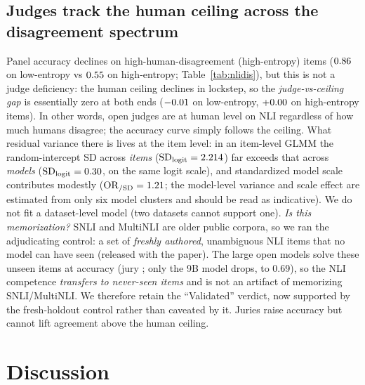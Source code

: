 \subsection{Judges track the human ceiling across the disagreement spectrum}
Panel accuracy declines on high-human-disagreement (high-entropy) items ($0.86$ on low-entropy vs
$0.55$ on high-entropy; Table~\ref{tab:nlidis}), but this is not a judge deficiency: the human ceiling
declines in lockstep, so the \emph{judge-vs-ceiling gap} is essentially zero at both ends ($-0.01$ on
low-entropy, $+0.00$ on high-entropy items). In other words, open judges are at human level on NLI regardless
of how much humans disagree; the accuracy curve simply follows the ceiling. What residual variance there is lives at
the item level: in an item-level GLMM the random-intercept SD across \emph{items} ($\mathrm{SD}_{\text{logit}}=
2.214$) far exceeds that across \emph{models} ($\mathrm{SD}_{\text{logit}}=0.30$, on the same
logit scale), and standardized model scale contributes modestly ($\mathrm{OR}_{/\mathrm{SD}}=1.21$; the model-level
variance and scale effect are estimated from only six model clusters and should be read as indicative). We do not fit
a dataset-level model (two datasets cannot support one). \emph{Is this memorization?} SNLI and MultiNLI are older public corpora, so we ran the adjudicating control: a set of
\FNn{} \emph{freshly authored}, unambiguous NLI items that no model can have seen (released with the paper). The large
open models solve these unseen items at \FNbest{} accuracy (jury \FNjury{}; only the 9B model drops, to 0.69), so the
NLI competence \emph{transfers to never-seen items} and is not an artifact of memorizing SNLI/MultiNLI. We therefore
retain the ``Validated'' verdict, now supported by the fresh-holdout control rather than caveated by it. Juries raise
accuracy but cannot lift agreement above the human ceiling.

\begin{table}[t]\centering\small
\caption{Study 3 (NLI) disagreement-aware results. Ceiling with annotator-bootstrap 95\% CI; best-model $\kappa$ and
macro-F1; panel accuracy on low- vs high-human-disagreement items; Jensen-Shannon panel-vs-human divergence.}
\label{tab:nlidis}

\end{table}
\section{Discussion}
